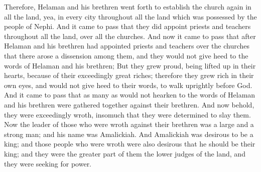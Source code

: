 Therefore, Helaman and his brethren went forth to establish the church again in all the land, yea, in every city throughout all the land which was possessed by the people of Nephi. And it came to pass that they did appoint priests and teachers throughout all the land, over all the churches.
\bverse \iffalse And now it came to pass that after Helaman and his brethren had appointed priests and teachers over the churches that there arose a dissension among them, and they would not give heed to the words of Helaman and his brethren; \fi
And now it came to pass that after Helaman and his brethren had appointed priests and teachers over the churches that there arose a dissension among them, and they would not give heed to the words of Helaman and his brethren;
\bverse \iffalse But they grew proud, being lifted up in their hearts, because of their exceedingly great riches; therefore they grew rich in their own eyes, and would not give heed to their words, to walk uprightly before God. \fi
But they grew proud, being lifted up in their hearts, because of their exceedingly great riches; therefore they grew rich in their own eyes, and would not give heed to their words, to walk uprightly before God.
\bchapter
\bverse \iffalse And it came to pass that as many as would not hearken to the words of Helaman and his brethren were gathered together against their brethren. \fi
And it came to pass that as many as would not hearken to the words of Helaman and his brethren were gathered together against their brethren.
\bverse \iffalse And now behold, they were exceedingly wroth, insomuch that they were determined to slay them. \fi
And now behold, they were exceedingly wroth, insomuch that they were determined to slay them.
\bverse \iffalse Now the leader of those who were wroth against their brethren was a large and a strong man; and his name was Amalickiah. \fi
Now the leader of those who were wroth against their brethren was a large and a strong man; and his name was Amalickiah.
\bverse \iffalse And Amalickiah was desirous to be a king; and those people who were wroth were also desirous that he should be their king; and they were the greater part of them the lower judges of the land, and they were seeking for power. \fi
And Amalickiah was desirous to be a king; and those people who were wroth were also desirous that he should be their king; and they were the greater part of them the lower judges of the land, and they were seeking for power.
\bverse \iffalse And they had been led by the flatteries of Amalickiah, that if they would support him and establish him to be their king that he would make them rulers over the people. \fi
